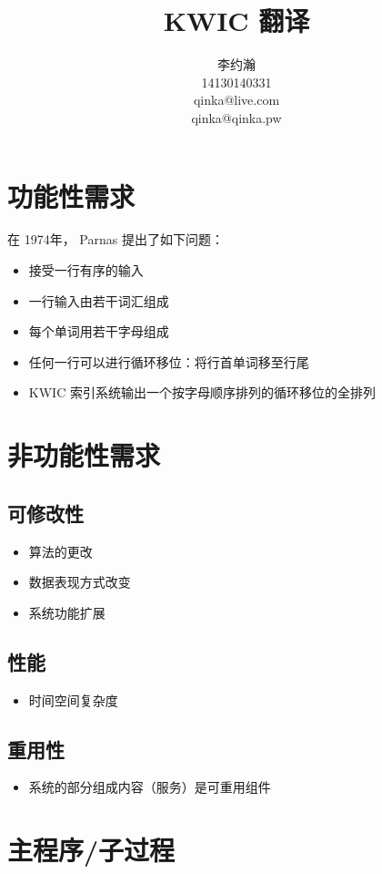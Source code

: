 \documentclass{ctexart}
\author{李约瀚 \\ 14130140331 \\ qinka@live.com \\ qinka@qinka.pw}
\title{KWIC 翻译}
\begin{document}
\maketitle

\section{功能性需求}

在 1974年， Parnas 提出了如下问题：
\begin{itemize}
    \item 接受一行有序的输入
    \item 一行输入由若干词汇组成
    \item 每个单词用若干字母组成
    \item 任何一行可以进行循环移位：将行首单词移至行尾
    \item KWIC 索引系统输出一个按字母顺序排列的循环移位的全排列
\end{itemize}

\section{非功能性需求}

\subsection{可修改性}
\begin{itemize}
    \item 算法的更改
    \item 数据表现方式改变
    \item 系统功能扩展
\end{itemize}

\subsection{性能}
\begin{itemize}
    \item 时间空间复杂度
\end{itemize}
\subsection{重用性}
\begin{itemize}
    \item 系统的部分组成内容（服务）是可重用组件
\end{itemize}

\section{主程序/子过程}
\end{document}
